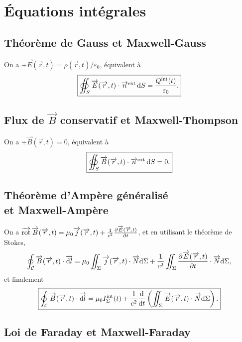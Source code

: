 \section{Équations intégrales}
\subsection{Théorème de Gauss et Maxwell-Gauss}

On a $\div\vec{E}(\vec{r},t)=\rho(\vec{r},t)/\varepsilon_0$, équivalent à 
\begin{equation*}
    \boxed{
        \oiint_{S}\protect\overrightarrow{{E}}(\protect\overrightarrow{{r}},t)\cdot\protect\overrightarrow{{n}}^{\mathrm{ext}}\,\mathrm{d} S=\frac{Q^{\mathrm{int}}(t)}{\varepsilon_0}.
    }
\end{equation*}

\subsection{Flux de \texorpdfstring{$\vec{B}$}{B} conservatif et Maxwell-Thompson}

On a $\div\vec{B}(\vec{r},t)=0$, équivalent à
\begin{equation*}
    \boxed{
        \oiint_{S}\protect\overrightarrow{{B}}(\protect\overrightarrow{{r}},t)\cdot\protect\overrightarrow{{n}}^{\mathrm{ext}}\,\mathrm{d} S=0.
    }
\end{equation*}

\subsection{Théorème d'Ampère généralisé\texorpdfstring{\\}{ }et Maxwell-Ampère}

On a $\operatorname{\overrightarrow{\text{rot}}}\protect\overrightarrow{{B}}(\protect\overrightarrow{{r}},t)=\mu_0\protect\overrightarrow{{j}}(\protect\overrightarrow{{r}},t)+\frac{1}{c^{2}}\frac{\partial\protect\overrightarrow{{E}}(\protect\overrightarrow{{r}},t)}{\partial t}$, et en utilisant le théorème de Stokes,
\begin{equation*}
    \oint_{\mathcal{C}}\protect\overrightarrow{{B}}(\protect\overrightarrow{{r}},t)\cdot\protect\overrightarrow{{\mathrm{d} l}}=\mu_0\iint_{\Sigma}\protect\overrightarrow{{j}}(\protect\overrightarrow{{r}},t)\cdot\protect\overrightarrow{{N}}\mathrm{d}\Sigma+\frac{1}{c^{2}}\iint_{\Sigma}\frac{\partial\protect\overrightarrow{{E}}(\protect\overrightarrow{{r}},t)}{\partial t}\cdot\protect\overrightarrow{{N}}\mathrm{d}\Sigma,
\end{equation*}
et finalement
\begin{equation*}
    \boxed{
        \oint_{\mathcal{C}}\protect\overrightarrow{{B}}(\protect\overrightarrow{{r}},t)\cdot\protect\overrightarrow{{\mathrm{d} l}}=\mu_{0}I_{\Sigma}^{\mathrm{int}}(t)+\frac{1}{c^{2}}\frac{\mathrm{d}}{\mathrm{d} t}\left(\iint_{\Sigma}\protect\overrightarrow{{E}}(\protect\overrightarrow{{r}},t)\cdot\protect\overrightarrow{{N}}\mathrm{d}\Sigma\right).
    }
\end{equation*}

\subsection{Loi de Faraday et Maxwell-Faraday}

